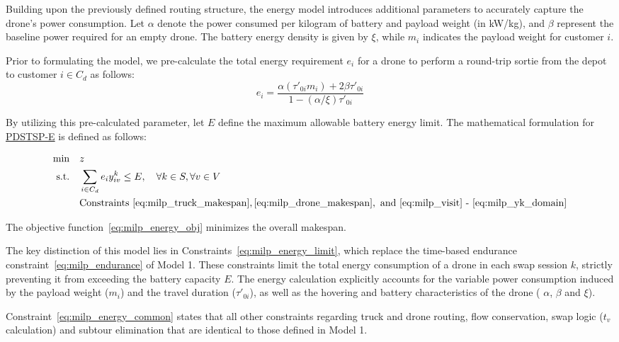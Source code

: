 \documentclass[3p, authoryear, 11pt]{elsarticle}
\begin{document}
Building upon the previously defined routing structure, the energy model introduces additional parameters to accurately capture the drone's power consumption. Let $\alpha$ denote the power consumed per kilogram of battery and payload weight (in kW/kg), and $\beta$ represent the baseline power required for an empty drone. The battery energy density is given by $\xi$, while $m_i$ indicates the payload weight for customer $i$.

Prior to formulating the model, we pre-calculate the total energy requirement $e_i$ for a drone to perform a round-trip sortie from the depot to customer $i \in C_d$ as follows:
\begin{equation}
    e_i = \frac{\alpha(\tau'_{0i}m_i) + 2\beta\tau'_{0i}}{1 - (\alpha/\xi)\tau'_{0i}} \label{eq:energy_consumption}
\end{equation}
\label{sec:energy_model_des}

By utilizing this pre-calculated parameter, let $E$ define the maximum allowable battery energy limit. The mathematical formulation for \hyperref[sec:pdstsp_e]{PDSTSP-E} is defined as follows:

\begin{align}
\text{min} \quad & z \label{eq:milp_energy_obj} \\
\text{s.t.} \quad & \sum_{i \in C_d} e_i y^k_{iv} \leq E, \quad \forall k \in S, \forall v \in V \label{eq:milp_energy_limit} \\
& \text{Constraints } \eqref{eq:milp_truck_makespan}, \eqref{eq:milp_drone_makespan}, \text{ and } \eqref{eq:milp_visit}\text{ - }\eqref{eq:milp_yk_domain} \label{eq:milp_energy_common}
\end{align}

The objective function~\eqref{eq:milp_energy_obj} minimizes the overall makespan.

The key distinction of this model lies in Constraints~\eqref{eq:milp_energy_limit}, which replace the time-based endurance constraint~\eqref{eq:milp_endurance} of Model 1. These constraints limit the total energy consumption of a drone in each swap session $k$, strictly preventing it from exceeding the battery capacity $E$. The energy calculation explicitly accounts for the variable power consumption induced by the payload weight ($m_i$) and the travel duration ($\tau'_{0i}$), as well as the hovering and battery characteristics of the drone ( $\alpha$, $\beta$ and $\xi$).

Constraint~\eqref{eq:milp_energy_common} states that all other constraints regarding truck and drone routing, flow conservation, swap logic ($t_v$ calculation) and subtour elimination that are identical to those defined in Model 1.
\end{document}
